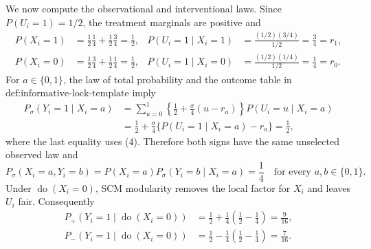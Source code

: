 We now compute the observational and interventional laws.  Since \(P(U_i=1)=1/2\), the treatment marginals are positive and
\[
\begin{aligned}
 P(X_i=1)&=\tfrac12\tfrac14+\tfrac12\tfrac34=\tfrac12,
 &P(U_i=1\mid X_i=1)&=\frac{(1/2)(3/4)}{1/2}=\tfrac34=r_1,\\
 P(X_i=0)&=\tfrac12\tfrac34+\tfrac12\tfrac14=\tfrac12,
 &P(U_i=1\mid X_i=0)&=\frac{(1/2)(1/4)}{1/2}=\tfrac14=r_0.
\end{aligned}                                                     \tag{4}
\]
For \(a\in\{0,1\}\), the law of total probability and the outcome table in \(\text{def:informative-lock-template}\) imply
\[
\begin{aligned}
 P_\sigma(Y_i=1\mid X_i=a)
 &=\sum_{u=0}^1
   \left\{\frac12+\frac{\sigma}{4}(u-r_a)\right\}
   P(U_i=u\mid X_i=a)\\
 &=\frac12+\frac{\sigma}{4}
   \{P(U_i=1\mid X_i=a)-r_a\}=\frac12,                 \tag{5}
\end{aligned}
\]
where the last equality uses (4).  Therefore both signs have the same unselected observed law and
\[
 P_\sigma(X_i=a,Y_i=b)=P(X_i=a)P_\sigma(Y_i=b\mid X_i=a)=\frac14
 \quad\text{for every }a,b\in\{0,1\}.                  \tag{6}
\]
Under \(\operatorname{do}(X_i=0)\), SCM modularity removes the local factor for \(X_i\) and leaves \(U_i\) fair.  Consequently
\[
\begin{aligned}
 P_+(Y_i=1\mid\operatorname{do}(X_i=0))
 &=\frac12+\frac14\left(\frac12-\frac14\right)=\frac9{16},\\
 P_-(Y_i=1\mid\operatorname{do}(X_i=0))
 &=\frac12-\frac14\left(\frac12-\frac14\right)=\frac7{16}. \tag{7}
\end{aligned}
\]

